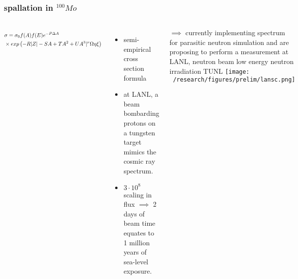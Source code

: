 \documentclass{beamer}
\begin{document}
	\begin{frame}
		\frametitle{spallation in $^{100}Mo$}
		\begin{columns}[c] %
			
			\begin{equation*}
			\resizebox{5cm}{!}{$
			\begin{split}
			& \sigma = \sigma_0 f(A)f(E)e^{-P\Delta A} \\
			& \times exp\left(-R|Z| -SA +TA^2 + UA^3|^{\nu} \Omega\eta\xi\right)
			\end{split}$}
			\end{equation*}
			
			\begin{itemize}
				\setlength\itemsep{2em}
				\item semi-empirical cross section formula
				\item at LANL, a beam bombarding protons on a tungsten target mimics the cosmic ray spectrum.
				\item $3\cdot 10^8 $ scaling in flux $\implies$ 2 days of beam time equates to 1 million years of sea-level exposure.
			\end{itemize}
			
			{\tiny $\implies$ currently implementing spectrum for parasitic neutron simulation and are proposing to perform a measurement at LANL, neutron beam low energy neutron irradiation TUNL}
			\hspace*{-0.4cm}\texttt{[image: ~/research/figures/prelim/lansc.png]}
			\begin{center}
			\end{center}
			
		\end{columns}
	\end{frame}
\end{document}
